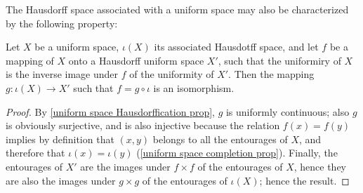 The Hausdorff space associated with a uniform space may also be characterized by the following property:
\begin{proposition}\label{uniform space Hausdorffication char}
Let $X$ be a uniform space, $\iota(X)$ its associated Hausdotff space, and let $f$ be a mapping of $X$ onto a Hausdorff uniform space $X'$, such that the uniformiry of $X$ is the inverse image under $f$ of the uniformity of $X'$. Then the mapping $g:\iota(X)\to X'$ such that $f=g\circ\iota$ is an isomorphism.
\end{proposition}
\begin{proof}
By \cref{uniform space Hausdorffication prop}, $g$ is uniformly continuous; also $g$ is obviously surjective, and is also injective because the relation $f(x)=f(y)$ implies by definition that $(x,y)$ belongs to all the entourages of $X$, and therefore that $\iota(x)=\iota(y)$ (\cref{uniform space completion prop}). Finally, the entourages of $X'$ are the images under $f\times f$ of the entourages of $X$, hence they are also the images under $g\times g$ of the entourages of $\iota(X)$; hence the result.
\end{proof}
